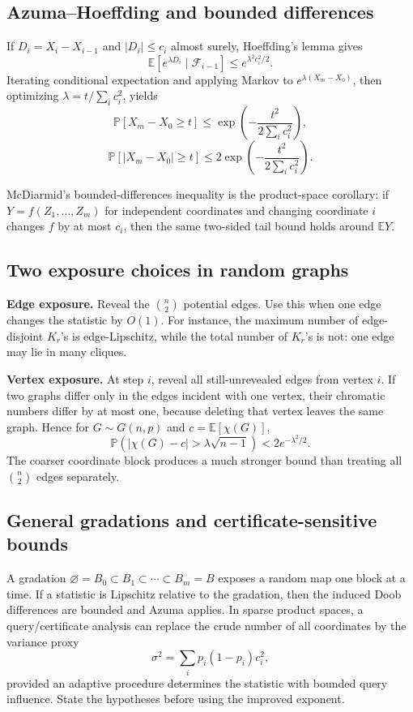 \documentclass[10pt]{article}
\newcommand{\E}{\mathbb E}
\newcommand{\Prb}{\mathbb P}
\newcommand{\1}{\mathbf 1}
\begin{document}
\subsection{Azuma--Hoeffding and bounded differences}

If $D_i=X_i-X_{i-1}$ and $|D_i|\leq c_i$ almost surely, Hoeffding's lemma gives
\[
 \E[e^{\lambda D_i}\mid\mathcal F_{i-1}]
 \leq e^{\lambda^2c_i^2/2}.
\]
Iterating conditional expectation and applying Markov to
$e^{\lambda(X_m-X_0)}$, then optimizing
$\lambda=t/\sum_i c_i^2$, yields
\[
 \Prb[X_m-X_0\geq t]\leq
 \exp\!\left(-\frac{t^2}{2\sum_i c_i^2}\right),
\]
\[
 \Prb[|X_m-X_0|\geq t]\leq
 2\exp\!\left(-\frac{t^2}{2\sum_i c_i^2}\right).       \tag{Azuma}
\]

McDiarmid's bounded-differences inequality is the product-space corollary:
if $Y=f(Z_1,\ldots,Z_m)$ for independent coordinates and changing coordinate
$i$ changes $f$ by at most $c_i$, then the same two-sided tail bound holds
around $\E Y$.

\subsection{Two exposure choices in random graphs}

\textbf{Edge exposure.}  Reveal the $\binom n2$ potential edges.  Use this when
one edge changes the statistic by $O(1)$.  For instance, the maximum number of
edge-disjoint $K_r$'s is edge-Lipschitz, while the total number of $K_r$'s is
not: one edge may lie in many cliques.

\textbf{Vertex exposure.}  At step $i$, reveal all still-unrevealed edges from
vertex $i$.  If two graphs differ only in the edges incident with one vertex,
their chromatic numbers differ by at most one, because deleting that vertex
leaves the same graph.  Hence for $G\sim G(n,p)$ and
$c=\E[\chi(G)]$,
\[
 \Prb\!\left(|\chi(G)-c|>\lambda\sqrt{n-1}\right)
 <2e^{-\lambda^2/2}.                                  \tag{Shamir--Spencer}
\]
The coarser coordinate block produces a much stronger bound than treating
all $\binom n2$ edges separately.

\subsection{General gradations and certificate-sensitive bounds}

A gradation
$\varnothing=B_0\subset B_1\subset\cdots\subset B_m=B$
exposes a random map one block at a time.  If a statistic is Lipschitz relative
to the gradation, then the induced Doob differences are bounded and Azuma
applies.  In sparse product spaces, a query/certificate analysis can replace
the crude number of all coordinates by the variance proxy
\[
 \sigma^2=\sum_i p_i(1-p_i)c_i^2,
\]
provided an adaptive procedure determines the statistic with bounded query
influence.  State the hypotheses before using the improved exponent.
\end{document}
